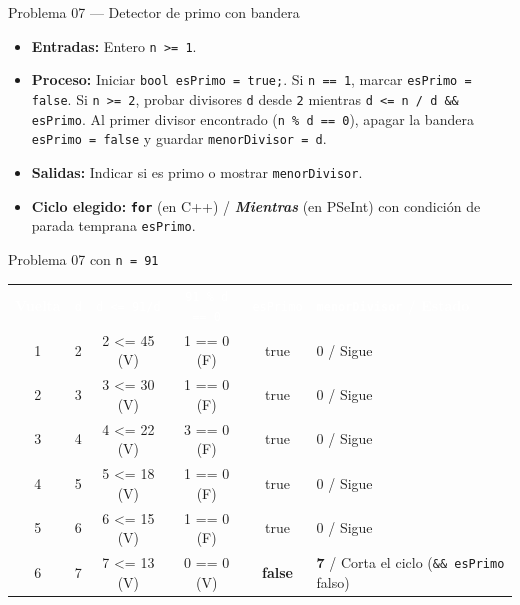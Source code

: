 \documentclass[11pt,letterpaper]{article}
\begin{document}
\begin{analisis}{Problema 07 --- Detector de primo con bandera}
\begin{itemize}
  \item \textbf{Entradas:} Entero \texttt{n >= 1}.
  \item \textbf{Proceso:} Iniciar \texttt{bool esPrimo = true;}. Si \texttt{n == 1}, marcar \texttt{esPrimo = false}. Si \texttt{n >= 2}, probar divisores \texttt{d} desde \texttt{2} mientras \texttt{d <= n / d \&\& esPrimo}. Al primer divisor encontrado (\texttt{n \% d == 0}), apagar la bandera \texttt{esPrimo = false} y guardar \texttt{menorDivisor = d}.
  \item \textbf{Salidas:} Indicar si es primo o mostrar \texttt{menorDivisor}.
  \item \textbf{Ciclo elegido:} \textbf{\texttt{for}} (en C++) / \textbf{\textit{Mientras}} (en PSeInt) con condición de parada temprana \texttt{esPrimo}.
\end{itemize}
\end{analisis}






\begin{pruebaescritorio}{Problema 07 con \texttt{n = 91}}
\begin{center}
\footnotesize
\setlength{\tabcolsep}{4pt}
\renewcommand{\arraystretch}{1.15}
\begin{tabularx}{\linewidth}{c c c c c X}
\rowcolor{AzulMarino}
\textcolor{white}{\textbf{Vuelta}} & \textcolor{white}{\texttt{d}} & \textcolor{white}{\texttt{d <= 91/d}} & \textcolor{white}{\texttt{91 \% d == 0}} & \textcolor{white}{\texttt{esPrimo}} & \textcolor{white}{\textbf{\texttt{menorDivisor} / Estado}} \\
1 & 2 & 2 <= 45 (V) & 1 == 0 (F) & true & 0 / Sigue \\
2 & 3 & 3 <= 30 (V) & 1 == 0 (F) & true & 0 / Sigue \\
3 & 4 & 4 <= 22 (V) & 3 == 0 (F) & true & 0 / Sigue \\
4 & 5 & 5 <= 18 (V) & 1 == 0 (F) & true & 0 / Sigue \\
5 & 6 & 6 <= 15 (V) & 1 == 0 (F) & true & 0 / Sigue \\
6 & 7 & 7 <= 13 (V) & 0 == 0 (V) & \textbf{false} & \textbf{7} / Corta el ciclo (\texttt{\&\& esPrimo} falso) \\
\bottomrule
\end{tabularx}
\end{center}
\end{pruebaescritorio}
\end{document}
